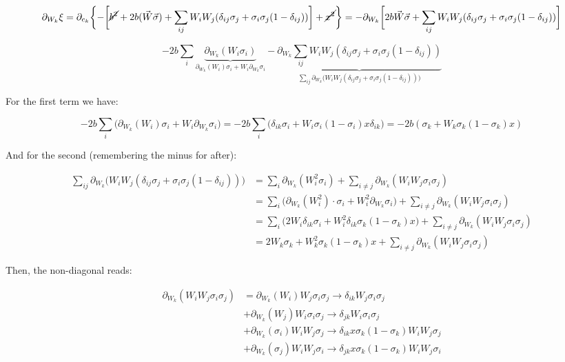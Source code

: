 \documentclass{book}
\begin{document}
\[\partial_{W_k}\xi=\partial_{c_k}\biggl\{-\biggl[\cancel{b^2}+2b(\vec{W}\vec{\sigma})+\sum_{ij}W_iW_j(\delta_{ij}\sigma_j+\sigma_i\sigma_j(1-\delta_{ij}))\biggr]+\cancel{x^2}\biggr\}=-\partial_{W_k}\bigg[2b\vec{W}\vec{\sigma}+\sum_{ij}W_iW_j(\delta_{ij}\sigma_j+\sigma_i\sigma_j(1-\delta_{ij}))\bigg]\]

\[-2b\sum_i\underbrace{\partial_{W_k}(W_i\sigma_i)}_{\partial_{W_k}(W_i)\sigma_i+W_i\partial_{W_k}\sigma_i}-\underbrace{\partial_{W_k}\sum_{ij}W_iW_j(\delta_{ij}\sigma_j+\sigma_i\sigma_j(1-\delta_{ij}))}_{\sum_{ij}\partial_{W_k}\bigg(W_iW_j(\delta_{ij}\sigma_j+\sigma_i\sigma_j(1-\delta_{ij}))\bigg)}\]

For the first term we have:

\[-2b\sum_i\bigg(\partial_{W_k}(W_i)\sigma_i+W_i\partial_{W_k}\sigma_i\bigg)=-2b\sum_i\bigg(\delta_{ik}\sigma_i+W_i\sigma_i(1-\sigma_i)x\delta_{ik}\bigg)=-2b(\sigma_k+W_k\sigma_k(1-\sigma_k)x)\]

And for the second (remembering the minus for after):

\begin{align*}
    \sum_{ij}\partial_{W_k}\bigg(W_iW_j(\delta_{ij}\sigma_j+\sigma_i\sigma_j(1-\delta_{ij}))\bigg) &= \sum_i\partial_{W_k}(W_i ^2\sigma_i)+\sum_{i\neq j}\partial_{W_k}(W_iW_j\sigma_i\sigma_j)\\&=\sum_i\bigg(\partial_{W_k}(W_i^2)\cdot \sigma_i+W_i^2\partial_{W_k}\sigma_i\bigg)+\sum_{i\neq j}\partial_{W_k}(W_iW_j\sigma_i\sigma_j)\\&=\sum_i\bigg(2W_i\delta_{ik}\sigma_i+W_i^2\delta_{ik}\sigma_k(1-\sigma_k)x\bigg)+\sum_{i\neq j}\partial_{W_k}(W_iW_j\sigma_i\sigma_j)\\&=2W_k\sigma_k+W_k^2\sigma_k(1-\sigma_k)x+\sum_{i\neq j}\partial_{W_k}(W_iW_j\sigma_i\sigma_j)
\end{align*}

Then, the non-diagonal reads:

\begin{align*}
    \partial_{W_k}(W_iW_j\sigma_i\sigma_j)&= \partial_{W_k}(W_i)W_j \sigma_i\sigma_j\to \delta_{ik}W_j\sigma_i\sigma_j \\&+\partial_{W_k}(W_j)W_i\sigma_i\sigma_j\to \delta_{jk}W_i\sigma_i\sigma_j\\ &+\partial_{W_k}(\sigma_i) W_iW_j\sigma_j \to \delta_{ik}x\sigma_k(1-\sigma_k)W_iW_j\sigma_j\\ &+\partial_{W_k}(\sigma_j)W_iW_j\sigma_i \to \delta_{jk}x\sigma_k(1-\sigma_k)W_iW_j\sigma_i
\end{align*}
\end{document}
